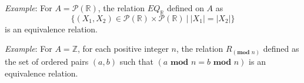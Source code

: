 

{\it Example}: For $A = \mathcal{P}(\mathbb{R})$, the relation $EQ_{\mathbb{R}}$ defined on $A$ as 
\[
\{ (X_1, X_2 ) \in\mathcal{P}(\mathbb{R})  \times \mathcal{P}(\mathbb{R}) ~|~ |X_1| = |X_2| \}
\]
is an equivalence relation.

\vfill

{\it Example}: For $A = \mathbb{Z}$, for each positive integer $n$, the relation $R_{(\textbf{mod } n)}$ defined as the set of ordered pairs $(a, b)$ such that $(a \textbf{ mod } n = b \textbf{ mod } n)$ is an equivalence relation.
\vfill